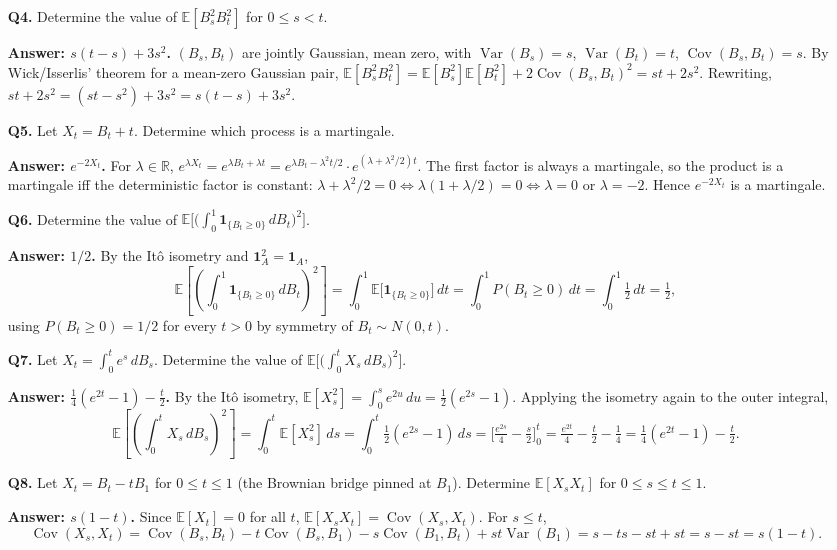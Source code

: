 \documentclass[11pt]{article}
\newcommand{\R}{\mathbb{R}}
\newcommand{\E}{\mathbb{E}}
\DeclareMathOperator{\Var}{Var}
\DeclareMathOperator{\Cov}{Cov}
\newcommand{\ans}[1]{\par\noindent\textbf{\color{blue!50!black}Answer: #1}}
\begin{document}
\begin{enumerate}
\item[\textbf{Q4.}] Determine the value of $\E[B_s^2B_t^2]$ for $0\le s<t$.

\ans{$s(t-s)+3s^2$.} $(B_s,B_t)$ are jointly Gaussian, mean zero, with $\Var(B_s)=s$, $\Var(B_t)=t$, $\Cov(B_s,B_t)=s$. By Wick/Isserlis' theorem for a mean-zero Gaussian pair, $\E[B_s^2B_t^2]=\E[B_s^2]\E[B_t^2]+2\Cov(B_s,B_t)^2=st+2s^2$. Rewriting, $st+2s^2=(st-s^2)+3s^2=s(t-s)+3s^2$.

\item[\textbf{Q5.}] Let $X_t=B_t+t$. Determine which process is a martingale.

\ans{$e^{-2X_t}$.} For $\lambda\in\R$, $e^{\lambda X_t}=e^{\lambda B_t+\lambda t}=e^{\lambda B_t-\lambda^2t/2}\cdot e^{(\lambda+\lambda^2/2)t}$. The first factor is always a martingale, so the product is a martingale iff the deterministic factor is constant: $\lambda+\lambda^2/2=0\iff\lambda(1+\lambda/2)=0\iff\lambda=0$ or $\lambda=-2$. Hence $e^{-2X_t}$ is a martingale.

\item[\textbf{Q6.}] Determine the value of $\E\Big[\big(\int_0^1\mathbf1_{\{B_t\ge0\}}\,dB_t\big)^2\Big]$.

\ans{$1/2$.} By the Itô isometry and $\mathbf1_A^2=\mathbf1_A$,
\[
\E\left[\left(\int_0^1\mathbf1_{\{B_t\ge0\}}\,dB_t\right)^2\right]=\int_0^1\E\big[\mathbf1_{\{B_t\ge0\}}\big]\,dt=\int_0^1P(B_t\ge0)\,dt=\int_0^1\tfrac12\,dt=\tfrac12,
\]
using $P(B_t\ge0)=1/2$ for every $t>0$ by symmetry of $B_t\sim N(0,t)$.

\item[\textbf{Q7.}] Let $X_t=\int_0^te^s\,dB_s$. Determine the value of $\E\Big[\big(\int_0^tX_s\,dB_s\big)^2\Big]$.

\ans{$\tfrac14(e^{2t}-1)-\tfrac t2$.} By the Itô isometry, $\E[X_s^2]=\int_0^se^{2u}\,du=\tfrac12(e^{2s}-1)$. Applying the isometry again to the outer integral,
\[
\E\left[\left(\int_0^tX_s\,dB_s\right)^2\right]=\int_0^t\E[X_s^2]\,ds=\int_0^t\tfrac12(e^{2s}-1)\,ds=\Big[\tfrac{e^{2s}}4-\tfrac s2\Big]_0^t=\tfrac{e^{2t}}4-\tfrac t2-\tfrac14=\tfrac14(e^{2t}-1)-\tfrac t2.
\]

\item[\textbf{Q8.}] Let $X_t=B_t-tB_1$ for $0\le t\le1$ (the Brownian bridge pinned at $B_1$). Determine $\E[X_sX_t]$ for $0\le s\le t\le1$.

\ans{$s(1-t)$.} Since $\E[X_t]=0$ for all $t$, $\E[X_sX_t]=\Cov(X_s,X_t)$. For $s\le t$,
\[
\Cov(X_s,X_t)=\Cov(B_s,B_t)-t\Cov(B_s,B_1)-s\Cov(B_1,B_t)+st\Var(B_1)=s-ts-st+st=s-st=s(1-t).
\]


\end{enumerate}
\end{document}

